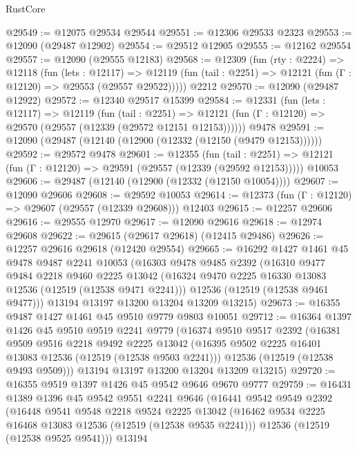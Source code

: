 \begin{lexlean}{RustCore}
\begin{coremodule}
@29549 := @12075 @29534 @29544
@29551 := @12306 @29533 @2323
@29553 := @12090 (@29487 @12902)
@29554 := @29512 @12905
@29555 := @12162 @29554
@29557 := @12090 (@29555 @12183)
@29568 := @12309
    (fun (rty : @2224) =>
    @12118
      (fun (lets : @12117) =>
      @12119 (fun (tail : @2251) => @12121 (fun (Γ : @12120) => @29553 (@29557 @29522)))))
    @2212
@29570 := @12090 (@29487 @12922)
@29572 := @12340 @29517 @15399
@29584 := @12331
    (fun (lets : @12117) =>
    @12119
      (fun (tail : @2251) =>
      @12121 (fun (Γ : @12120) => @29570 (@29557 (@12339 (@29572 @12151 @12153))))))
    @9478
@29591 := @12090 (@29487 (@12140 (@12900 (@12332 (@12150 (@9479 @12153))))))
@29592 := @29572 @9478
@29601 := @12355
    (fun (tail : @2251) => @12121 (fun (Γ : @12120) => @29591 (@29557 (@12339 (@29592 @12153)))))
    @10053
@29606 := @29487 (@12140 (@12900 (@12332 (@12150 @10054))))
@29607 := @12090 @29606
@29608 := @29592 @10053
@29614 := @12373 (fun (Γ : @12120) => @29607 (@29557 (@12339 @29608))) @12403
@29615 := @12257 @29606
@29616 := @29555 @12970
@29617 := @12090 @29616
@29618 := @12974 @29608
@29622 := @29615 (@29617 @29618) (@12415 @29486)
@29626 := @12257 @29616 @29618 (@12420 @29554)
@29665 := @16292
    @1427
    @1461
    @45
    @9478
    @9487
    @2241
    @10053
    (@16303
      @9478
      @9485
      @2392
      (@16310
        @9477
        @9484
        @2218
        @9460
        @2225
        @13042
        (@16324 @9470 @2225 @16330 @13083 @12536 (@12519 (@12538 @9471 @2241)))
        @12536
        (@12519 (@12538 @9461 @9477)))
      @13194
      @13197
      @13200
      @13204
      @13209
      @13215)
@29673 := @16355 @9487 @1427 @1461 @45 @9510 @9779 @9803 @10051
@29712 := @16364
    @1397
    @1426
    @45
    @9510
    @9519
    @2241
    @9779
    (@16374
      @9510
      @9517
      @2392
      (@16381
        @9509
        @9516
        @2218
        @9492
        @2225
        @13042
        (@16395 @9502 @2225 @16401 @13083 @12536 (@12519 (@12538 @9503 @2241)))
        @12536
        (@12519 (@12538 @9493 @9509)))
      @13194
      @13197
      @13200
      @13204
      @13209
      @13215)
@29720 := @16355 @9519 @1397 @1426 @45 @9542 @9646 @9670 @9777
@29759 := @16431
    @1389
    @1396
    @45
    @9542
    @9551
    @2241
    @9646
    (@16441
      @9542
      @9549
      @2392
      (@16448
        @9541
        @9548
        @2218
        @9524
        @2225
        @13042
        (@16462 @9534 @2225 @16468 @13083 @12536 (@12519 (@12538 @9535 @2241)))
        @12536
        (@12519 (@12538 @9525 @9541)))
      @13194

\end{coremodule}
\end{lexlean}
